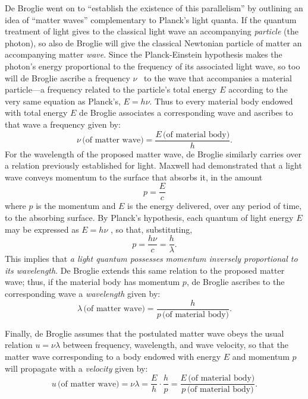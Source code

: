 De Broglie went on to ``establish the existence of this parallelism'' by
outlining an idea of ``matter waves'' complementary to Planck's light
quanta. If the quantum treatment of light gives to the classical light
wave an accompanying \emph{particle} (the photon), so also de Broglie
will give the classical Newtonian particle of matter an accompanying
matter \emph{wave}. Since the Planck-Einstein hypothesis makes the
photon's energy proportional to the frequency of its associated light
wave, so too will de Broglie ascribe a frequency $\nu$~ to the wave
that accompanies a material particle---a frequency related to the
particle's total energy $E$ according to the very same equation as
Planck's, $E = h\nu$. Thus to every material body endowed with
total energy $E$ de Broglie associates a corresponding wave and
ascribes to that wave a frequency given by:
\begin{equation*}
\nu\,\text{(of matter wave)} = \frac{E\,\text{(of material body)}}{h}.
\end{equation*}
For the wavelength of the proposed matter wave, de Broglie similarly
carries over a relation previously established for light. Maxwell had
demonstrated that a light wave conveys momentum to the surface that
absorbs it, in the amount
\begin{equation*}
p = \frac{E}{c}
\end{equation*}
where $p$ is the momentum and $E$ is the energy delivered,
over any period of time, to the absorbing surface. By Planck's
hypothesis, each quantum of light energy $E$ may be expressed as
$E = h\nu$ , so that, substituting,
\begin{equation*}
p = \frac{h\nu}{c} = \frac{h}{\lambda}.
\end{equation*}
This implies that \emph{a light quantum possesses} \emph{momentum
inversely proportional to its wavelength}. De Broglie extends this same
relation to the proposed matter wave; thus, if the material body has
momentum $p$, de Broglie ascribes to the corresponding wave a
\emph{wavelength} given by:
\begin{equation*}\label{SchDeB2}
\lambda\,\text{(of matter wave)} = \frac{h}{p\,\text{(of material body)}}.
\end{equation*}

Finally, de Broglie assumes that the postulated matter wave obeys the
usual relation $u = \nu\lambda$ between frequency, wavelength, and
wave velocity, so that the matter wave corresponding to a body endowed
with energy $E$ and momentum $p$ will propagate with a
\emph{velocity} given by:
\begin{equation*}
u\,\text{(of matter wave)}=\nu\lambda=\frac{E}{h}\cdot\frac{h}{p}=
\frac{E\,\text{(of material body)}}{p\,\text{(of material body)}}.
\end{equation*}

